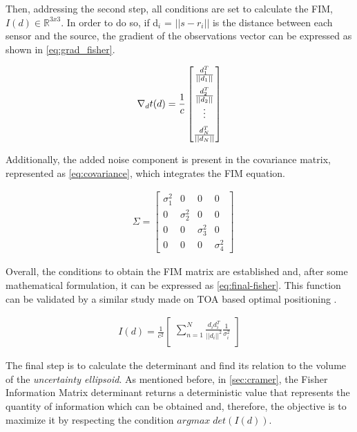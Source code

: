 Then, addressing the second step, all conditions are set to calculate the FIM,  $I(d) \in \mathbb{R}^{3x3}$. In order to do so, if d$_{i}$ = $|| s - r_{i} ||$ is the distance between each sensor and the source, the gradient of the observations vector can be expressed as shown in \ref{eq:grad_fisher}.

\begin{eqnarray}
\nabla_{d}t(d) = \frac{1}{c} 
\begin{bmatrix}
\frac{d_1^T}{||d_1||} \\ 
\addlinespace
\frac{d_2^T}{||d_2||} \\
\vdots \\
\addlinespace
\frac{d_N^T}{||d_N||}
\end{bmatrix}
\label{eq:grad_fisher}
\end{eqnarray}

Additionally, the added noise component is present in the covariance matrix, represented as \ref{eq:covariance}, which integrates the FIM equation.

\begin{eqnarray}
& \Sigma = 
\begin{bmatrix}
\sigma_1^2 & 0 & 0 & 0 \\
0 & \sigma_2^2 & 0 & 0 \\
0 & 0  & \sigma_3^2  & 0 \\
0 & 0 & 0 & \sigma_4^2 
\end{bmatrix}
\label{eq:covariance}
\end{eqnarray}

Overall, the conditions to obtain the FIM matrix are established and, after some mathematical formulation, it can be expressed as \ref{eq:final-fisher}. This function can be validated by a similar study made on TOA based optimal positioning \cite{cramer-bruno}.

\begin{eqnarray}
I(d) = \frac{1}{c^2} 
\begin{bmatrix}
\sum_{n=1}^{N} \frac{d_i d_i^T}{||d_i||^2} \frac{1}{\sigma_i^2}\\
\end{bmatrix}
\label{eq:final-fisher}
\end{eqnarray}

The final step is to calculate the determinant and find its relation to the volume of the \textit{uncertainty ellipsoid}. As mentioned before, in \ref{sec:cramer}, the Fisher Information Matrix determinant returns a deterministic value that represents the quantity of information which can be obtained and, therefore, the objective is to maximize it by respecting the condition $argmax \; det(I(d))$.


